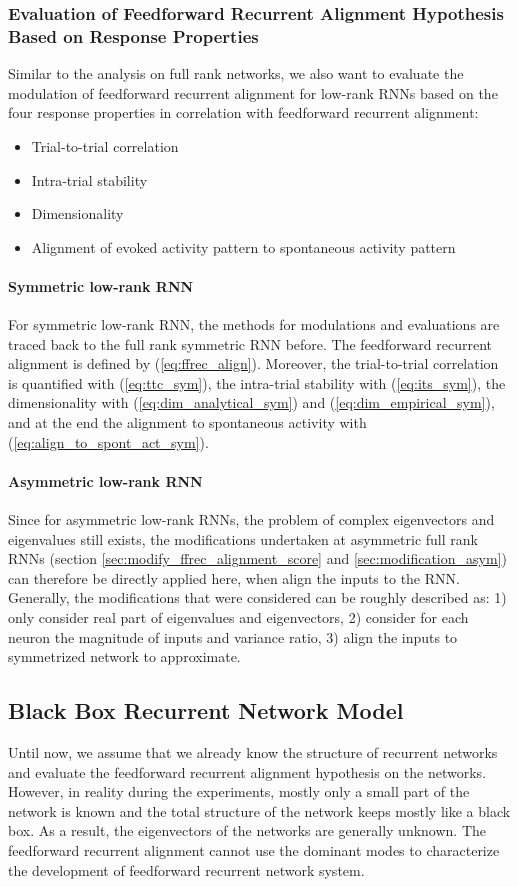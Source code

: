 \documentclass[11pt]{article}
\begin{document}
	\subsubsection{Evaluation of Feedforward Recurrent Alignment Hypothesis Based on Response Properties}
	Similar to the analysis on full rank networks, we also want to evaluate the modulation of feedforward recurrent alignment for low-rank RNNs based on the four response properties in correlation with feedforward recurrent alignment: 
		\begin{itemize}
			\item Trial-to-trial correlation
			\item Intra-trial stability
			\item Dimensionality 
			\item Alignment of evoked activity pattern to spontaneous activity pattern
		\end{itemize}
	
	\paragraph{Symmetric low-rank RNN} For symmetric low-rank RNN, the methods for modulations and evaluations are traced back to the full rank symmetric RNN before. The feedforward recurrent alignment is defined by (\ref{eq:ffrec_align}). Moreover, the trial-to-trial correlation is quantified with (\ref{eq:ttc_sym}), the intra-trial stability with (\ref{eq:its_sym}), the dimensionality with (\ref{eq:dim_analytical_sym}) and (\ref{eq:dim_empirical_sym}), and at the end the alignment to spontaneous activity with (\ref{eq:align_to_spont_act_sym}). 
	
	\paragraph{Asymmetric low-rank RNN} Since for asymmetric low-rank RNNs, the problem of complex eigenvectors and eigenvalues still exists, the modifications undertaken at asymmetric full rank RNNs (section \ref{sec:modify_ffrec_alignment_score} and \ref{sec:modification_asym}) can therefore be directly applied here, when align the inputs to the RNN. Generally, the modifications that were considered can be roughly described as: 1) only consider real part of eigenvalues and eigenvectors, 2) consider for each neuron the magnitude of inputs and variance ratio, 3) align the inputs to symmetrized network to approximate. 
	
	\clearpage
	\subsection{Black Box Recurrent Network Model}
	Until now, we assume that we already know the structure of recurrent networks and evaluate the feedforward recurrent alignment hypothesis on the networks. However, in reality during the experiments, mostly only a small part of the network is known and the total structure of the network keeps mostly like a black box. As a result, the eigenvectors of the networks are generally unknown. The feedforward recurrent alignment cannot use the dominant modes to characterize the development of feedforward recurrent network system. 
	
\end{document}
